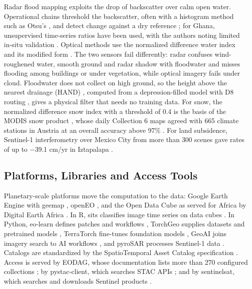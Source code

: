 \documentclass[conference]{IEEEtran}
\begin{document}
Radar flood mapping exploits the drop of backscatter over calm open water. Operational chains threshold the backscatter, often with a histogram method such as Otsu's \cite{otsu1979}, and detect change against a dry reference \cite{twele2016flood,uddin2019bangladesh}; for Ghana, unsupervised time-series ratios have been used, with the authors noting limited in-situ validation \cite{toffah2026ghana}. Optical methods use the normalized difference water index \cite{mcfeeters1996ndwi} and its modified form \cite{xu2006mndwi}. The two sensors fail differently: radar confuses wind-roughened water, smooth ground and radar shadow with floodwater and misses flooding among buildings or under vegetation, while optical imagery fails under cloud. Floodwater does not collect on high ground, so the height above the nearest drainage (HAND) \cite{nobre2011hand}, computed from a depression-filled model \cite{barnes2014priorityflood} with D8 routing \cite{ocallaghan1984d8}, gives a physical filter that needs no training data. For snow, the normalized difference snow index with a threshold of 0.4 is the basis of the MODIS snow product \cite{hall1995ndsi}, whose daily Collection 6 maps agreed with 665 climate stations in Austria at an overall accuracy above 97\% \cite{tong2020snow}. For land subsidence, Sentinel-1 interferometry over Mexico City from more than 300 scenes gave rates of up to $-$39.1 cm/yr in Iztapalapa \cite{cigna2021mexico}.

\subsection{Platforms, Libraries and Access Tools}

Planetary-scale platforms move the computation to the data: Google Earth Engine \cite{gorelick2017gee} with geemap \cite{wu2020geemap}, openEO \cite{schramm2021openeo}, and the Open Data Cube \cite{lewis2017datacube} as served for Africa by Digital Earth Africa \cite{digitalearthafrica}. In R, sits classifies image time series on data cubes \cite{simoes2021sits}. In Python, eo-learn defines patches and workflows \cite{sentinelhub2021eolearn}, TorchGeo supplies datasets and pretrained models \cite{stewart2022torchgeo,paszke2019pytorch}, TerraTorch fine-tunes foundation models \cite{gomes2025terratorch}, GeoAI joins imagery search to AI workflows \cite{wu2026geoai,wu2021leafmap,wu2023samgeo}, and pyroSAR processes Sentinel-1 data \cite{truckenbrodt2019pyrosar}. Catalogs are standardized by the SpatioTemporal Asset Catalog specification \cite{stac2021}. Access is served by EODAG, whose documentation lists more than 270 configured collections \cite{eodag2026}; by pystac-client, which searches STAC APIs \cite{pystacclient2026}; and by sentinelsat, which searches and downloads Sentinel products \cite{sentinelsat2026}.
\end{document}
